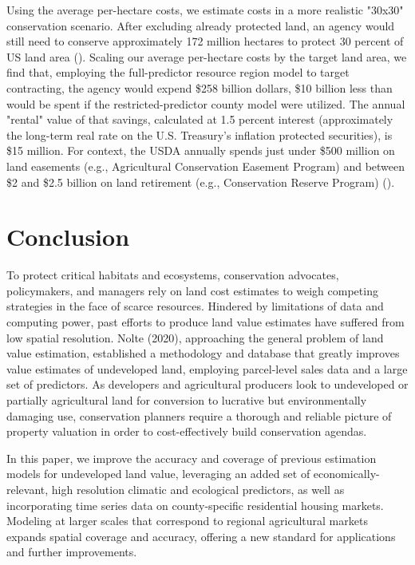 \documentclass[12pt]{article}
\begin{document}
Using the average per-hectare costs, we estimate costs in a more realistic "30x30" conservation scenario. After excluding already protected land, an agency would still need to conserve approximately 172 million hectares to protect 30 percent of US land area (\cite{simmons2021}). Scaling our average per-hectare costs by the target land area, we find that, employing the full-predictor resource region model to target contracting, the agency would expend \$258 billion dollars, \$10 billion less than would be spent if the restricted-predictor county model were utilized. The annual "rental" value of that savings, calculated at 1.5 percent interest (approximately the long-term real rate on the U.S. Treasury's inflation protected securities), is \$15 million. For context, the USDA annually spends just under \$500 million on land easements (e.g., Agricultural Conservation Easement Program) and between \$2 and \$2.5 billion on land retirement (e.g., Conservation Reserve Program) (\cite{Stubbs2019AgriculturalBill}).

\section{Conclusion}

To protect critical habitats and ecosystems, conservation advocates, policymakers, and managers rely on land cost estimates to weigh competing strategies in the face of scarce resources. Hindered by limitations of data and computing power, past efforts to produce land value estimates have suffered from low spatial resolution. Nolte (2020), approaching the general problem of land value estimation, established a methodology and database that greatly improves value estimates of undeveloped land, employing parcel-level sales data and a large set of predictors. As developers and agricultural producers look to undeveloped or partially agricultural land for conversion to lucrative but environmentally damaging use, conservation planners require a thorough and reliable picture of property valuation in order to cost-effectively build conservation agendas.

In this paper, we improve the accuracy and coverage of previous estimation models for undeveloped land value, leveraging an added set of economically-relevant, high resolution climatic and ecological predictors, as well as incorporating time series data on county-specific residential housing markets. Modeling at larger scales that correspond to regional agricultural markets expands spatial coverage and accuracy, offering a new standard for applications and further improvements. 
\end{document}

